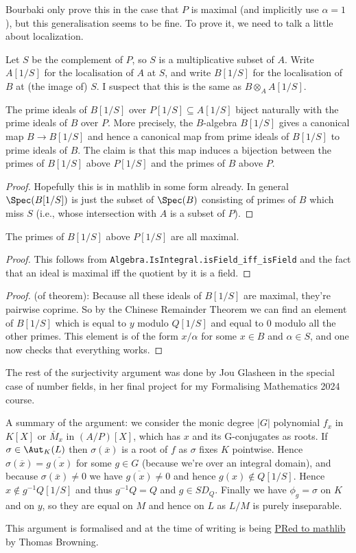 Bourbaki only prove this in the case that $P$ is maximal (and implicitly use $\alpha=1$),
but this generalisation seems to be fine. To prove it, we need to talk a little about localization.

Let $S$ be the complement of $P$, so $S$ is a multiplicative subset of $A$.
Write $A[1/S]$ for the localisation of $A$ at $S$, and write $B[1/S]$
for the localisation of $B$ at (the image of) $S$. I suspect that this is the
same as $B\otimes_AA[1/S]$.

\begin{lemma}
  The prime ideals of $B[1/S]$ over $P[1/S] \subseteq A[1/S]$ biject naturally with
  the prime ideals of $B$ over $P$. More precisely, the $B$-algebra $B[1/S]$
  gives a canonical map $B\to B[1/S]$ and hence a canonical map from prime ideals
  of $B[1/S]$ to prime ideals of $B$. The claim is that this map induces
  a bijection between the primes of $B[1/S]$ above $P[1/S]$ and the primes
  of $B$ above $P$.
\end{lemma}
\begin{proof}
  Hopefully this is in mathlib in some form already. In general $\Spec(B[1/S])$ is just the subset of $\Spec(B)$
  consisting of primes of $B$ which miss $S$ (i.e., whose intersection with $A$ is a subset of $P$).
\end{proof}

\begin{lemma}
  The primes of $B[1/S]$ above $P[1/S]$ are all maximal.
\end{lemma}
\begin{proof}
  This follows from {\tt Algebra.IsIntegral.isField\_iff\_isField} and the fact
  that an ideal is maximal iff the quotient by it is a field.
\end{proof}

\begin{proof}(of theorem):
Because all these ideals of $B[1/S]$ are maximal, they're pairwise coprime.
So by the Chinese Remainder Theorem we can find an element of $B[1/S]$ which
is equal to $y$ modulo $Q[1/S]$ and equal to $0$ modulo all the other primes.
This element is of the form $x/\alpha$ for some $x\in B$ and $\alpha\in S$,
and one now checks that everything works.
\end{proof}

The rest of the surjectivity argument was done
by Jou Glasheen in the special case of number fields, in her
final project for my Formalising Mathematics 2024 course.

A summary of the argument: we consider the monic degree $|G|$ polynomial $f_x$ in $K[X]$ or
$\overline{M}_x$ in $(A/P)[X]$,
which has $x$ and its G-conjugates as roots. If $\sigma\in\Aut_K(L)$ then $\sigma(\overline{x})$
is a root of $f$ as $\sigma$ fixes $K$ pointwise. Hence $\sigma(\overline{x})=\overline{g(x)}$
for some $g\in G$ (because we're over an integral domain), and because $\sigma(\overline{x})\not=0$
we have $\overline{g(x)}\not=0$
and hence $g(x)\notin Q[1/S]$. Hence $x\notin g^{-1} Q[1/S]$ and thus $g^{-1}Q=Q$ and $g\in SD_Q$.
Finally we have $\phi_g=\sigma$ on $K$ and on $y$, so they are equal on $M$ and hence on $L$ as
$L/M$ is purely inseparable.

This argument is formalised and at the time of writing
is being \href{https://github.com/leanprover-community/mathlib4/pull/17717}{PRed to mathlib}
by Thomas Browning.
